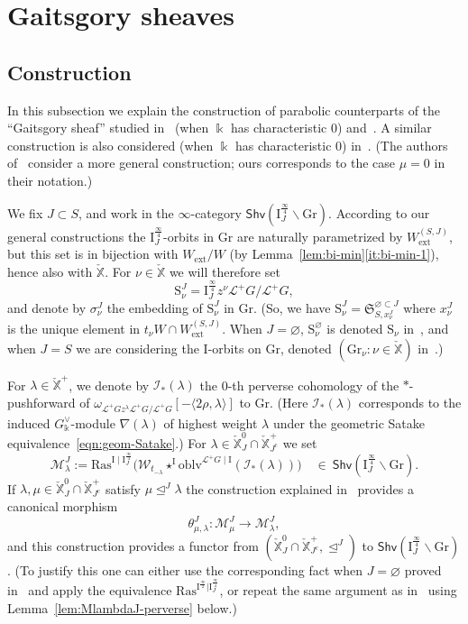 \documentclass[11pt]{amsart}
\numberwithin{equation}{section}
\theoremstyle{plain}
\theoremstyle{definition}
\newcommand{\I}{{\mathrm I}}
\newcommand{\sI}{{\mathcal I}}
\renewcommand{\k}{\Bbbk}
\newcommand{\sL}{{\mathcal L}}
\newcommand{\sM}{{\mathcal M}}
\newcommand{\fS}{{\mathfrak{S}}}
\newcommand{\sW}{{\mathcal W}}
\newcommand{\X}{{\mathbb X}}
\newcommand{\Xd}{\check{\X}}
\newcommand{\semi}{{{\frac{\infty}{2}}}}
\newcommand{\quar}{{{\frac{\infty}{4}}}}
\newcommand{\oblv}{\mathrm{oblv}}
\newcommand{\ex}{\mathrm{ext}}
\newcommand{\Shv}{\mathsf{Shv}}
\newcommand{\Ras}{\mathrm{Ras}}
\newcommand{\Gr}{\mathrm{Gr}}
\newcommand{\comp}{\mathrm{c}}
\begin{document}
\section{Gaitsgory sheaves} 
\label{sec:Gaitsgory}

\subsection{Construction}

In this subsection we explain the construction of parabolic counterparts of the ``Gaitsgory sheaf'' studied in~\cite{Gaits18} (when $\k$ has characteristic $0$) and~\cite{adr}. A similar construction is also considered (when $\k$ has characteristic $0$) in~\cite{DL23}. (The authors of~\cite{DL23} consider a more general construction; ours corresponds to the case $\mu=0$ in their notation.)

We fix $J \subset S$, and work in the $\infty$-category $\Shv\left( \I^\quar_J \backslash \Gr \right)$. According to our general constructions the $\I^\quar_J$-orbits in $\Gr$ are naturally parametrized by $W_\ex^{(S,J)}$, but this set is in bijection with $W_\ex / W$ (by Lemma~\ref{lem:bi-min}\eqref{it:bi-min-1}), hence also with $\Xd$. For $\nu \in \Xd$ we will therefore set
\[
\mathrm{S}_\nu^J = \I^\quar_J z^\nu \sL^+G/\sL^+G,
\]
and denote by $\sigma^J_\nu$ the embedding of $\mathrm{S}_\nu^J$ in $\Gr$. (So, we have $\mathrm{S}^J_\nu = \fS^{\varnothing \subset J}_{S,x^J_\nu}$ where $x^J_\nu$ is the unique element in $t_\nu W \cap W_{\ex}^{(S,J)}$. When $J=\varnothing$, $\mathrm{S}_\nu^\varnothing$ is denoted $\mathrm{S}_\nu$ in~\cite{adr}, and when $J=S$ we are considering the $\I$-orbits on $\Gr$, denoted $(\Gr_\nu : \nu \in \Xd)$ in~\cite{adr}.)

For $\lambda\in \Xd^+$, we denote by $\sI_*(\lambda)$ the 0-th perverse cohomology of the $*$-pushforward of $\omega_{\sL^+G z^\lambda \sL^+G/\sL^+G}[-\langle2\rho,\lambda\rangle]$ to $\Gr$. (Here $\sI_*(\lambda)$ corresponds to the induced $G^\vee_\k$-module $\nabla(\lambda)$ of highest weight $\lambda$ under the geometric Satake equivalence~\eqref{eqn:geom-Satake}.)
For $\lambda\in \Xd^0_J\cap \Xd^+_{J^\comp}$ 
we set 
\[
\sM^J_\lambda:= \Ras^{\I\mid \I^\quar_J}\big( \sW_{t_{-\lambda}} \star^\I \oblv^{\sL^+G\mid \I}(\sI_*(\lambda)) \big) 
\quad \in\ \Shv\left( \I^\quar_J \backslash \Gr \right). 
\]
If $\lambda,\mu \in \Xd^0_J\cap \Xd^+_{J^\comp}$ satisfy $\mu \unlhd^J \lambda$ the construction explained in~\cite[\S 8.1]{adr} provides a canonical morphism 
\[
\theta^J_{\mu,\lambda}: \sM^J_\mu \rightarrow \sM^J_\lambda,
\]
and this construction provides a functor from $(\Xd^0_J\cap \Xd^+_{J^\comp},\unlhd^J)$ to $\Shv\left( \I^\quar_J \backslash \Gr \right)$. (To justify this one can either use the corresponding fact when $J=\varnothing$ proved in~\cite[\S 8.1]{adr} and apply the equivalence $\Ras^{\I^\semi | \I_J^\quar}$, or repeat the same argument as in~\cite{adr} using Lemma~\ref{lem:MlambdaJ-perverse} below.)
\end{document}
